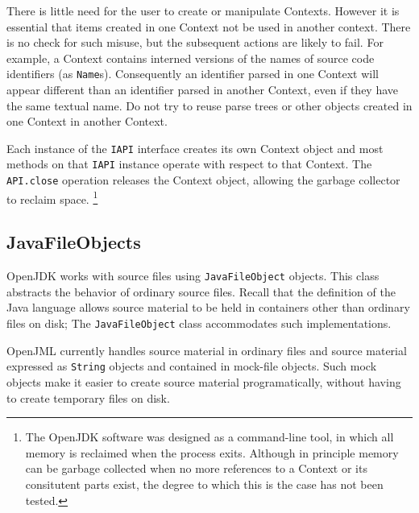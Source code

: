\documentclass{report}%
\begin{document}
There is little need for the user to create or manipulate
Contexts. However it is essential that items created in one Context not be used in another context. There is no check for such misuse, but the subsequent actions are likely to fail. For example, a Context contains interned versions of the names of
source code identifiers (as {\tt Name}s). Consequently an identifier parsed in one Context will 
appear different than an identifier
parsed in another Context, even if they have the same textual name. Do not try to reuse parse trees or other objects 
created in one Context in another Context.
 
Each instance of the {\tt IAPI} interface creates its own Context object and most methods on 
that {\tt IAPI} instance operate with respect to that Context. The {\tt API.close} operation 
releases the Context object, allowing the garbage collector to reclaim space.
\footnote{The OpenJDK software was designed as a command-line tool, in which all memory is reclaimed
when the process exits. Although in principle memory can be garbage collected when no more references
to a Context or its consitutent parts exist, the degree to which this is the case has not been tested.}

\label{JavaFileObjects}
\subsection{JavaFileObjects}

OpenJDK works with source files using {\tt JavaFileObject} objects. This class abstracts the behavior of 
ordinary source files. Recall that the definition of the Java language allows source material to be held 
in containers other than ordinary files on disk; The {\tt JavaFileObject} class accommodates such implementations.

OpenJML currently handles source material in ordinary files and source material expressed as {\tt String} objects
and contained in mock-file objects. Such mock objects make it easier to create source material programatically, 
without having to create temporary files on disk.
\end{document}
